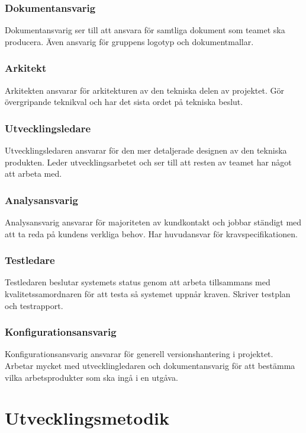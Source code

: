 \subsubsection*{Dokumentansvarig}
Dokumentansvarig ser till att ansvara för samtliga dokument som teamet ska producera. Även ansvarig för gruppens logotyp och dokumentmallar.

\subsubsection*{Arkitekt}
Arkitekten ansvarar för arkitekturen av den tekniska delen av projektet. Gör övergripande teknikval och har det sista ordet på tekniska beslut.

\subsubsection*{Utvecklingsledare}
Utvecklingsledaren ansvarar för den mer detaljerade designen av den tekniska produkten. Leder utvecklingsarbetet och ser till att resten av teamet har något att arbeta med.

\subsubsection*{Analysansvarig}
Analysansvarig ansvarar för majoriteten av kundkontakt och jobbar ständigt med att ta reda på kundens verkliga behov. Har huvudansvar för kravspecifikationen.

\subsubsection*{Testledare}
Testledaren beslutar systemets status genom att arbeta tillsammans med kvalitetssamordnaren för att testa så systemet uppnår kraven. Skriver testplan och testrapport.

\subsubsection*{Konfigurationsansvarig}
Konfigurationsansvarig ansvarar för generell versionshantering i projektet. Arbetar mycket med utvecklingledaren och dokumentansvarig för att bestämma vilka arbetsprodukter som ska ingå i en utgåva.

\section{Utvecklingsmetodik}

